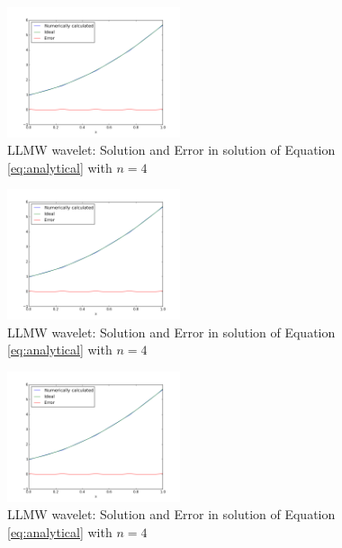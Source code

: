 \documentclass{scrartcl}
\begin{document}
\begin{figure}
        \centering{}
\includegraphics[width=2in]{allmw4.png}
\caption{\label{fig:aqlmw4}LLMW wavelet: Solution and Error in solution of Equation \ref{eq:analytical} with $n=4$}
\end{figure}

\begin{figure}
        \centering{}
\includegraphics[width=2in]{allmw4.png}
\caption{\label{fig:allmw4}LLMW wavelet: Solution and Error in solution of Equation \ref{eq:analytical} with $n=4$}
\end{figure}

\begin{figure}
        \centering{}
\includegraphics[width=2in]{allmw4.png}
\caption{\label{fig:allmw4}LLMW wavelet: Solution and Error in solution of Equation \ref{eq:analytical} with $n=4$}
\end{figure}

\lipsum[50-80]

\begin{figure}
        \lipsum[2]
\end{figure}

\lipsum[90-120]
\end{document}
